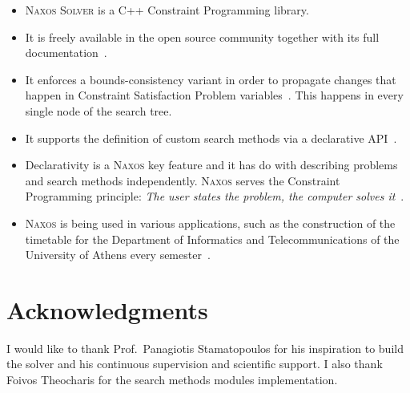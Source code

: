 \documentclass[a4paper]{article}
\begin{document}
\title{}

\author{Nikolaos Pothitos}


\date{}

\maketitle

\begin{itemize}
  \item \textsc{Naxos Solver} is a C++ Constraint
        Programming library.
  \item It is freely available in the open source community
        together with its full documentation~\cite{Naxos}.
  \item It enforces a bounds-consistency variant in order to
        propagate changes that happen in Constraint
        Satisfaction Problem variables~\cite{Bessiere2006}.
        This happens in every single node of the search
        tree.
  \item It supports the definition of custom search methods
        via a declarative API~\cite{Pothitos2017}.
  \item Declarativity is a \textsc{Naxos} key feature and it
        has do with describing problems and search methods
        independently. \textsc{Naxos} serves the Constraint
        Programming principle: \emph{The user states the
        problem, the computer solves it}~\cite{Freuder2014}.
  \item \textsc{Naxos} is being used in various
        applications, such as the construction of the
        timetable for the Department of Informatics and
        Telecommunications of the University of Athens every
        semester~\cite{Pothitos2012-Scheduling}.
\end{itemize}

\section*{Acknowledgments}

I would like to thank Prof.~Panagiotis Stamatopoulos for his
inspiration to build the solver and his continuous
supervision and scientific support. I also thank Foivos
Theocharis for the search methods modules implementation.



\end{document}
